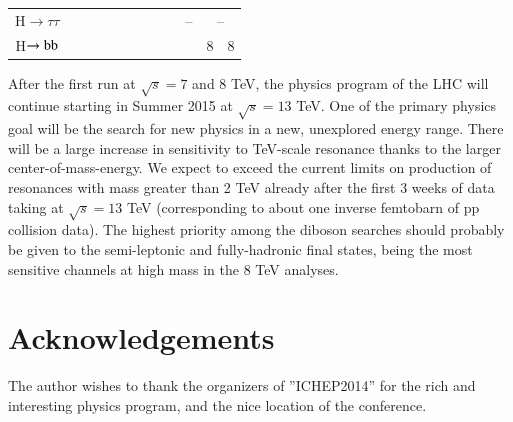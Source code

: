 \documentclass[3p,times,twocolumn]{elsarticle}
\begin{document}
\begin{table}[htbp]
\begin{tabular}{| c | c c c c c c c c c c c |}
H$\rightarrow\tau\tau$ & \cellcolor{gray!40} &\cellcolor{gray!40}
&\cellcolor{gray!40}  & \cellcolor{gray!40} &
\cellcolor{gray!40}&\cellcolor{gray!40}  
&\cellcolor{gray!40} &\cellcolor{gray!40} & \multicolumn{1}{c}{--} & \multicolumn{2}{c|}{--} \\
H$\rightarrow\rm{bb}$ & \cellcolor{gray!40} & \cellcolor{gray!40} &
\cellcolor{gray!40}  & \cellcolor{gray!40} &\cellcolor{gray!40}  &
\cellcolor{gray!40} & \cellcolor{gray!40} &\cellcolor{gray!40} &
\cellcolor{gray!40}& \cellcolor{blue!25}8 &
\multicolumn{1}{c|}{\cellcolor{red!25}8} \\
\hline
\end{tabular}
\label{tab:summary}
\end{table}

After the first run at $\sqrt{s}=7$ and 8 TeV, the physics program of
the LHC will continue starting in Summer 2015 at $\sqrt{s}=13$ TeV. 
One of the primary physics goal will be the search for new physics
in a new, unexplored energy range. There will be a large 
increase in sensitivity to TeV-scale resonance thanks to the larger 
center-of-mass-energy. We expect to exceed the current limits 
on production of resonances with mass greater than 2 TeV
already after the first 3 weeks of data taking at $\sqrt{s}=13$ TeV
(corresponding to about one inverse femtobarn of pp collision data). The highest priority 
among the diboson searches should probably be given to the
semi-leptonic and fully-hadronic final
states, being the most sensitive channels at high mass in the 8 TeV analyses. 

\section*{Acknowledgements}

The author wishes to thank the organizers of ”ICHEP2014” for the rich
and interesting physics program, and the nice location of the conference.





\end{document}
